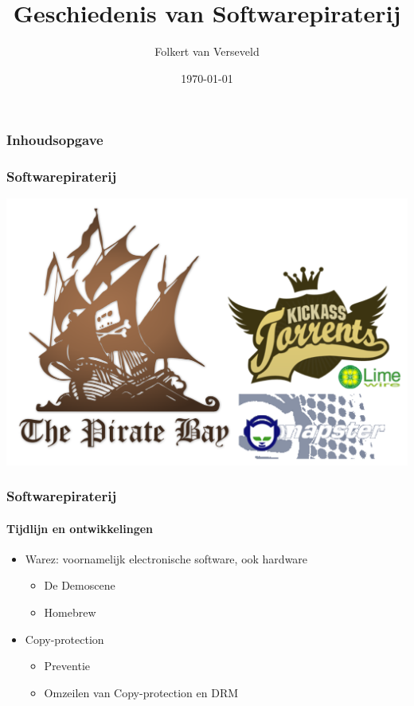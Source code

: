 \documentclass{beamer}
\title{Geschiedenis van Softwarepiraterij}
\author{Folkert van Verseveld}
\institute{Universiteit van Amsterdam}
\date{\today}
\begin{document}
\frame{\titlepage}

\begin{frame}
\frametitle{Inhoudsopgave}
\tableofcontents
\end{frame}

\begin{frame}
	\frametitle{Softwarepiraterij}

	\begin{center}
	\includegraphics[width=\textwidth]{torrentsites.png}
	\end{center}
\end{frame}

\begin{frame}
	\frametitle{Softwarepiraterij}
	\framesubtitle{Tijdlijn en ontwikkelingen}

	\begin{itemize}
		\item Warez: voornamelijk electronische software, ook hardware
		\begin{itemize}
			\item De Demoscene
			\item Homebrew
		\end{itemize}
		\item Copy-protection
		\begin{itemize}
			\item Preventie
			\item Omzeilen van Copy-protection en DRM
		\end{itemize}
	\end{itemize}
\end{frame}
\end{document}
